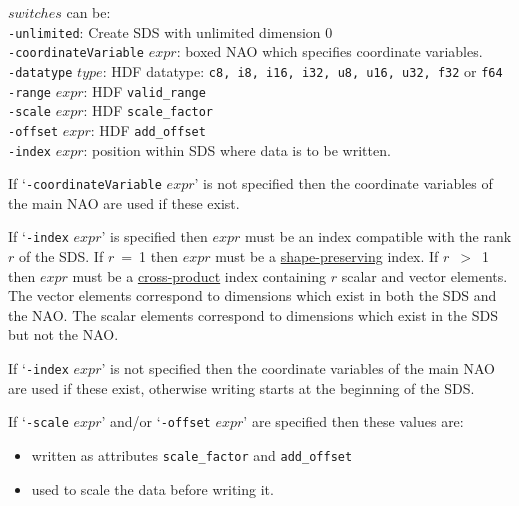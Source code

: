   $switches$ can be:
  \\
  \texttt{-unlimited}: Create SDS with unlimited dimension 0
  \\
  \texttt{-coordinateVariable} 
  $expr$: boxed NAO which specifies coordinate variables.
  \\
  \texttt{-datatype} 
  $type$: HDF datatype: 
  \texttt{c8, i8, i16, i32, u8, u16, u32, f32} or 
  \texttt{f64}
  \\
  \texttt{-range} 
  $expr$: HDF 
  \texttt{valid\_range}
  \\
  \texttt{-scale} 
  $expr$: HDF 
  \texttt{scale\_factor}
  \\
  \texttt{-offset} 
  $expr$: HDF 
  \texttt{add\_offset}
  \\
  \texttt{-index} 
  $expr$: position within SDS where data is to be written.
  

If `\texttt{-coordinateVariable} 
  $expr$' is not specified then the coordinate variables
  of the main NAO are used if these exist.
  

If `\texttt{-index} 
  $expr$' is specified then 
  $expr$ must be an index compatible with the rank 
  $r$ of the SDS. If 
  $r$\ =\ 1 then 
  $expr$ must be a 
  \href{indexing.html\#Shape-Preserving}{shape-preserving} index.
  If 
  $r$\ $>$\ 1 then 
  $expr$ must be a 
  \href{indexing.html\#Cross-product-index}{cross-product} index
  containing 
  $r$ scalar and vector elements. The vector elements
  correspond to dimensions which exist in both the SDS and the NAO. The
  scalar elements correspond to dimensions which exist in the SDS but
  not the NAO.
  

If `\texttt{-index} 
  $expr$' is not specified then the coordinate variables
  of the main NAO are used if these exist, otherwise writing starts at
  the beginning of the SDS.
  

If `\texttt{-scale} 
  $expr$' and/or `\texttt{-offset} 
  $expr$' are specified then these values are:
  \begin{itemize}
    \item written as attributes 
    \texttt{scale\_factor} and 
    \texttt{add\_offset}
    \item used to scale the data before writing it.
  \end{itemize}
  

